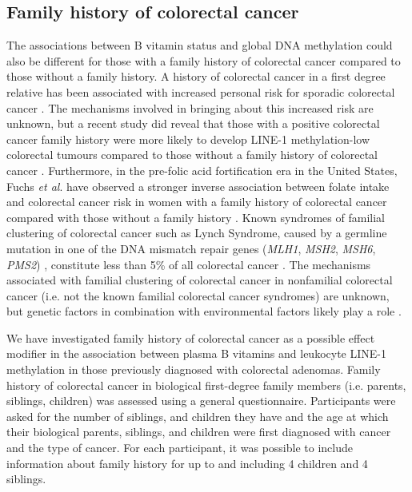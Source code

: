 \subsection{Family history of colorectal cancer} %
\noindent The associations between B vitamin status and global DNA methylation could also be different for those with a family history of colorectal cancer compared to those without a family history. A history of colorectal cancer in a first degree relative has been associated with increased personal risk for sporadic colorectal cancer \cite{c766,c767}. The mechanisms involved in bringing about this increased risk are unknown, but a recent study did reveal that those with a positive colorectal cancer family history were more likely to develop LINE-1 methylation-low colorectal tumours compared to those without a family history of colorectal cancer \cite{c768}. Furthermore, in the pre-folic acid fortification era in the United States, Fuchs \emph{et al}. have observed a stronger inverse association between folate intake and colorectal cancer risk in women with a family history of colorectal cancer compared with those without a family history \cite{c769}. Known syndromes of familial clustering of colorectal cancer such as Lynch Syndrome, caused by a germline mutation in one of the DNA mismatch repair genes (\emph{MLH1}, \emph{MSH2}, \emph{MSH6}, \emph{PMS2}) \cite{c770}, constitute less than 5\% of all colorectal cancer \cite{c771}. The mechanisms associated with familial clustering of colorectal cancer in nonfamilial colorectal cancer (i.e. not the known familial colorectal cancer syndromes) are unknown, but genetic factors in combination with environmental factors likely play a role \cite{c772}. 
 
\noindent We have investigated family history of colorectal cancer as a possible effect modifier in the association between plasma B vitamins and leukocyte LINE-1 methylation in those previously diagnosed with colorectal adenomas. Family history of colorectal cancer in biological first-degree family members (i.e. parents, siblings, children) was assessed using a general questionnaire. Participants were asked for the number of siblings, and children they have and the age at which their biological parents, siblings, and children were first diagnosed with cancer and the type of cancer. For each participant, it was possible to include information about family history for up to and including 4 children and 4 siblings. 
 
